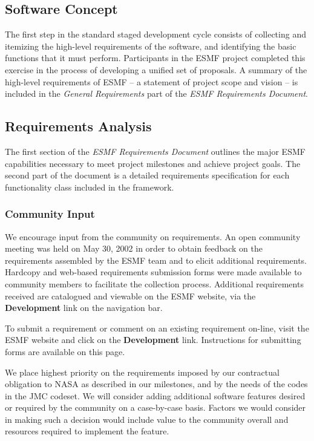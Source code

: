 \subsection{Software Concept}

The first step in the standard staged development cycle consists of 
collecting and itemizing the high-level requirements of the software, and 
identifying the basic functions that it must perform.  Participants in
the ESMF project completed this exercise in the process of developing
a unified set of proposals.  A summary of the high-level requirements
of ESMF -- a statement of project scope and vision -- is included 
in the {\it General Requirements} part of the {\it ESMF Requirements Document}\cite{bib:ESMFreqdoc}.

\subsection {Requirements Analysis}

The first section of the {\it ESMF Requirements Document} outlines 
the major ESMF capabilities necessary to meet project milestones and achieve 
project goals.  The second part of the document is a detailed 
requirements specification for each functionality class included in 
the framework.  

\subsubsection{Community Input}
We encourage input from the community on requirements.
An open community meeting was held on May 30, 2002 in order to obtain
feedback on the requirements assembled by the ESMF team and to elicit
additional requirements.  Hardcopy and web-based requirements submission
forms were made available to community members to facilitate the collection
process.  Additional requirements received are catalogued and viewable 
on the ESMF website, via the {\bf Development} link on the navigation bar.

To submit a requirement or comment on an existing requirement on-line,
visit the ESMF website and click on the {\bf Development} link.
Instructions for submitting forms are available on this page.

We place highest priority on the requirements imposed by our contractual
obligation to NASA as described in our milestones, and by the needs of
the codes in the JMC codeset.  We will consider adding additional software
features desired or required by the community on a case-by-case basis.
Factors we would consider in making such a decision would include value
to the community overall and resources required to implement the feature.

